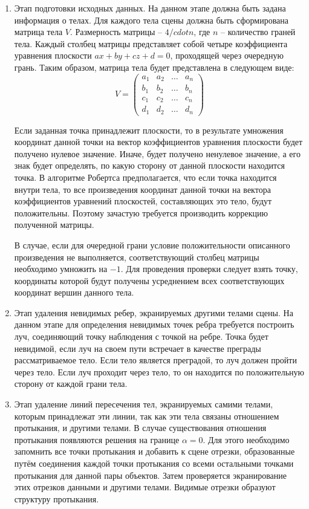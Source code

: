 \begin{enumerate}[label=\arabic*)]
	\item Этап подготовки исходных данных.
	На данном этапе должна быть задана информация о телах. Для каждого тела сцены должна быть сформирована матрица тела $V$. Размерность матрицы -- $4 /cdot n$, где $n$ -- количество граней тела. Каждый столбец матрицы представляет собой четыре коэффициента уравнения плоскости $ax + by + cz + d = 0$, проходящей через очередную грань. Таким образом, матрица тела будет представлена в следующем виде:
	\begin{equation}
		V = \begin{pmatrix}
			a_{1} & a_{2} & \ldots & a_{n}\\
			b_{1} & b_{2} & \ldots & b_{n}\\
			c_{1} & c_{2} & \ldots & c_{n}\\
			d_{1} & d_{2} & \ldots & d_{n}
		\end{pmatrix}
	\end{equation}
	
	Если заданная точка принадлежит плоскости, то в результате умножения координат
данной точки на вектор коэффициентов уравнения плоскости будет получено нулевое
значение. Иначе, будет получено ненулевое значение, а его знак будет
определять, по какую сторону от данной плоскости находится точка. В алгоритме Робертса предполагается, что если точка находится внутри тела, то все произведения
координат данной точки на вектора коэффициентов уравнений плоскостей, составляющих это тело, будут положительны. Поэтому зачастую требуется производить коррекцию полученной матрицы.

В случае, если для очередной грани условие положительности описанного произведения не выполняется, соответствующий столбец матрицы необходимо умножить на $-1$. 
Для проведения проверки следует
взять точку, координаты которой будут получены усреднением всех соответствующих
координат вершин данного тела.

 
	\item Этап удаления невидимых ребер, экранируемых другими телами сцены.
	На данном этапе для определения невидимых точек ребра требуется построить луч, соединяющий точку наблюдения с точкой на ребре. Точка будет невидимой, если луч на своем пути встречает в качестве преграды рассматриваемое тело. Если тело является преградой, то луч должен пройти через тело. Если луч проходит через тело, то он находится по положительную сторону от каждой грани тела.

        \item Этап удаление линий пересечения тел, экранируемых самими телами, которым принадлежат эти линии, так как эти тела связаны отношением протыкания, и другими телами. В случае существования отношения протыкания появляются решения на границе $\alpha = 0$. Для этого необходимо запомнить все точки протыкания и добавить к
    сцене отрезки, образованные путём соединения каждой точки протыкания со всеми остальными точками протыкания для данной пары объектов. Затем проверяется
    экранирование этих отрезков данными и другими телами. Видимые отрезки образуют структуру протыкания.
\end{enumerate}

